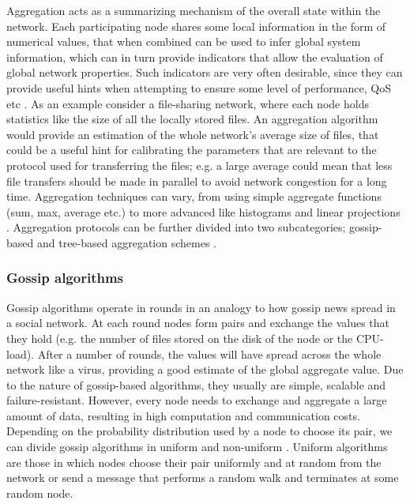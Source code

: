 \documentclass[a4paper,11pt,twoside]{report}
\begin{document}
Aggregation acts as a summarizing mechanism of the overall state within the network. Each participating node shares some local information in the form of numerical values, that when combined can be used to infer global system information, which can in turn provide indicators that allow the evaluation of global network properties. Such indicators are very often desirable, since they can provide useful hints when attempting to ensure some level of performance, QoS etc \cite{Makhloufi:2009:DAP:1692742.1692756}. As an example consider a file-sharing network, where each node holds statistics like the size of all the locally stored files. An aggregation algorithm would provide an estimation of the whole network's average size of files, that could be a useful hint for calibrating the parameters that are relevant to the protocol used for transferring the files; e.g. a large average could mean that less file transfers should be made in parallel to avoid network congestion for a long time. Aggregation techniques can vary, from using simple aggregate functions (sum, max, average etc.) to more advanced like histograms \cite{Jurca:2009:CHL:1688933.1688991} and linear projections \cite{1662440}. Aggregation protocols can be further divided into two subcategories; gossip-based and tree-based aggregation schemes \cite{Makhloufi:2009:DAP:1692742.1692756}.

\subsubsection*{Gossip algorithms}

Gossip algorithms operate in rounds in an analogy to how gossip news spread in a social network. At each round nodes form pairs and exchange the values that they hold (e.g. the number of files stored on the disk of the node or the CPU-load). After a number of rounds, the values will have spread across the whole network like a virus, providing a good estimate of the global aggregate value. Due to the nature of gossip-based algorithms, they usually are simple, scalable and failure-resistant. However, every node needs to exchange and aggregate a large amount of data, resulting in high computation and communication costs.\\

Depending on the probability distribution used by a node to choose its pair, we can divide gossip algorithms in uniform \cite{Kempe:2003:GCA:946243.946317} and non-uniform \cite{Kempe:2004:SGR:1039488.1039491} \cite{Rabbat:2007:SGA:1524876.1525177}. Uniform algorithms are those in which nodes choose their pair uniformly and at random from the network or send a message that performs a random walk and terminates at some random node. \\
\end{document}
